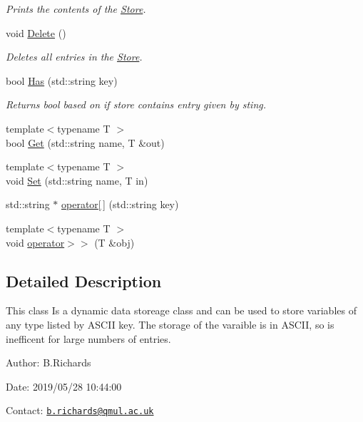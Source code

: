 \begin{DoxyCompactItemize}
\begin{DoxyCompactList}\small\item\em Prints the contents of the \hyperlink{classStore}{Store}. \end{DoxyCompactList}\item 
\hypertarget{classStore_a7fce0f8f3ec7978c5e7cd3d7053f899b}{void \hyperlink{classStore_a7fce0f8f3ec7978c5e7cd3d7053f899b}{Delete} ()}\label{classStore_a7fce0f8f3ec7978c5e7cd3d7053f899b}

\begin{DoxyCompactList}\small\item\em Deletes all entries in the \hyperlink{classStore}{Store}. \end{DoxyCompactList}\item 
bool \hyperlink{classStore_a41eaa81c4612fb5bdbf850afb6428977}{Has} (std\-::string key)
\begin{DoxyCompactList}\small\item\em Returns bool based on if store contains entry given by sting. \end{DoxyCompactList}\item 
{\footnotesize template$<$typename T $>$ }\\bool \hyperlink{classStore_abdc0134daa34b808328070f5d6b295f3}{Get} (std\-::string name, T \&out)
\item 
{\footnotesize template$<$typename T $>$ }\\void \hyperlink{classStore_af586739813ce18da6f5e3561d134a814}{Set} (std\-::string name, T in)
\item 
std\-::string $\ast$ \hyperlink{classStore_a790ca02bc7d11648edf0c8d5df3751fe}{operator\mbox{[}$\,$\mbox{]}} (std\-::string key)
\item 
{\footnotesize template$<$typename T $>$ }\\void \hyperlink{classStore_abe9b65d1308c43dc4158b00d6aed7385}{operator$>$$>$} (T \&obj)
\end{DoxyCompactItemize}


\subsection{Detailed Description}
This class Is a dynamic data storeage class and can be used to store variables of any type listed by A\-S\-C\-I\-I key. The storage of the varaible is in A\-S\-C\-I\-I, so is inefficent for large numbers of entries.

\begin{DoxyParagraph}{Author\-:}
B.\-Richards 
\end{DoxyParagraph}
\begin{DoxyParagraph}{Date\-:}
2019/05/28 10\-:44\-:00 
\end{DoxyParagraph}
Contact\-: \href{mailto:b.richards@qmul.ac.uk}{\tt b.\-richards@qmul.\-ac.\-uk} 

